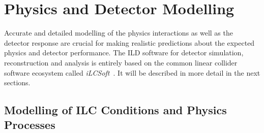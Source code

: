 %
%

\newcommand{\CPP}{C\nolinebreak\hspace{-.05em}\raisebox{.4ex}{\tiny\bf +}\nolinebreak\hspace{-.10em}\raisebox{.4ex}{\tiny\bf +}}


\chapter{ \label{chap:modelling} Physics and Detector Modelling}
\label{chap:modelling}

Accurate and detailed modelling of the physics interactions as well as the detector
response are crucial for making realistic predictions about the expected physics and detector
performance. The ILD software for detector simulation, reconstruction and analysis is entirely
based on the common linear collider software ecosystem called \emph{iLCSoft}~\cite{bib:ilcsoft}.
It will be described in more detail in the next sections.

\section{\label{sec:generator} Modelling of ILC Conditions and Physics Processes}
%

